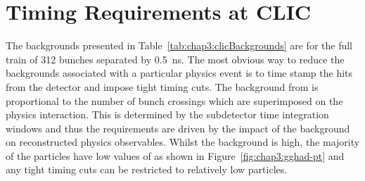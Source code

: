 \section{Timing Requirements at CLIC\label{sec:chapter3:clic_detector:timingRequirements}}

The backgrounds presented in Table~\ref{tab:chap3:clicBackgrounds} are for the
full train of 312 bunches separated by 0.5~ns. The most obvious way to reduce
the backgrounds associated with a particular physics event is to time stamp the
hits from the detector and impose tight timing cuts. The background from
\gghadrons is proportional to the number of bunch crossings which are
superimposed on the physics interaction. This is determined by the subdetector
time integration windows and thus the requirements are driven by the impact of
the background on reconstructed physics observables. Whilst the \gghadrons
background is high, the majority of the particles have low values of
\pT as shown in Figure~\ref{fig:chap3:gghad-pt} and any tight timing cuts can be restricted to
relatively low \pT particles. 

